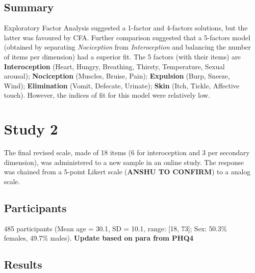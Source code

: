 \documentclass[
  man,floatsintext]{apa6}
\begin{document}
\hypertarget{summary}{%
\subsection{Summary}\label{summary}}

Exploratory Factor Analysis suggested a 1-factor and 4-factors solutions, but the latter was favoured by CFA. Further comparison suggested that a 5-factors model (obtained by separating \emph{Nociception} from \emph{Interoception} and balancing the number of items per dimension) had a superior fit. The 5 factors (with their items) are \textbf{Interoception} (Heart, Hungry, Breathing, Thirsty, Temperature, Sexual arousal); \textbf{Nociception} (Muscles, Bruise, Pain); \textbf{Expulsion} (Burp, Sneeze, Wind); \textbf{Elimination} (Vomit, Defecate, Urinate); \textbf{Skin} (Itch, Tickle, Affective touch). However, the indices of fit for this model were relatively low.

\hypertarget{study-2}{%
\section{Study 2}\label{study-2}}

The final revised scale, made of 18 items (6 for interoception and 3 per secondary dimension), was administered to a new sample in an online study. The response was chained from a 5-point Likert scale (\textbf{ANSHU TO CONFIRM}) to a analog scale.

\hypertarget{participants-1}{%
\subsection{Participants}\label{participants-1}}

485 participants (Mean age = 30.1, SD = 10.1, range: {[}18, 73{]}; Sex: 50.3\% females, 49.7\% males).
\textbf{Update based on para from PHQ4}

\hypertarget{results-1}{%
\subsection{Results}\label{results-1}}
\end{document}
